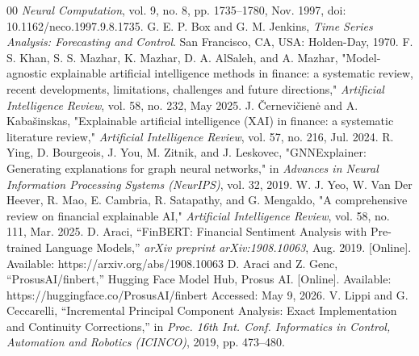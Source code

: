 \documentclass[conference]{IEEEtran}
\begin{document}
\begin{thebibliography}{00}
    \textit{Neural Computation}, vol. 9, no. 8, pp. 1735--1780, Nov. 1997,
    doi: 10.1162/neco.1997.9.8.1735.
    G. E. P. Box and G. M. Jenkins, \textit{Time Series Analysis:
    Forecasting and Control}. San Francisco, CA, USA:
    Holden-Day, 1970.
    F. S. Khan, S. S. Mazhar, K. Mazhar, D. A. AlSaleh, and A. Mazhar, "Model-agnostic explainable artificial intelligence methods in finance: a systematic review, recent developments, limitations, challenges and future directions," \textit{Artificial Intelligence Review}, vol. 58, no. 232, May 2025.
    J. Černevičienė and A. Kabašinskas, "Explainable artificial intelligence (XAI) in finance: a systematic literature review," \textit{Artificial Intelligence Review}, vol. 57, no. 216, Jul. 2024.
    R. Ying, D. Bourgeois, J. You, M. Zitnik, and J. Leskovec, "GNNExplainer: Generating explanations for graph neural networks," in \textit{Advances in Neural Information Processing Systems (NeurIPS)}, vol. 32, 2019.
    W. J. Yeo, W. Van Der Heever, R. Mao, E. Cambria, R. Satapathy, and G. Mengaldo, "A comprehensive review on financial explainable AI," \textit{Artificial Intelligence Review}, vol. 58, no. 111, Mar. 2025.
    D. Araci, ``FinBERT: Financial Sentiment Analysis with Pre-trained
    Language Models,'' \textit{arXiv preprint arXiv:1908.10063}, Aug. 2019.
    [Online]. Available: https://arxiv.org/abs/1908.10063
    D. Araci and Z. Genc, ``ProsusAI/finbert,'' Hugging Face Model Hub,
    Prosus AI. [Online]. Available: https://huggingface.co/ProsusAI/finbert
    Accessed: May 9, 2026.
    V. Lippi and G. Ceccarelli, ``Incremental Principal Component Analysis:
    Exact Implementation and Continuity Corrections,'' in \textit{Proc. 16th
    Int. Conf. Informatics in Control, Automation and Robotics (ICINCO)},
    2019, pp. 473--480.
    

\end{thebibliography}
\end{document}
